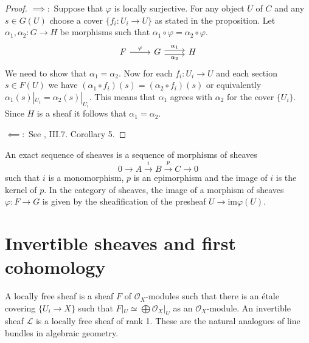 \begin{proof}
	$\implies:$ Suppose that $\varphi$ is locally surjective. For any object $U$ of $C$ and any $s \in G(U)$ choose a cover $\{f_i: U_i \to U\}$ as stated in the proposition. Let $\alpha_1, \alpha_2: G \to H$ be morphisms such that $\alpha_1 \circ \varphi = \alpha_2 \circ \varphi$.
	\[
		\begin{tikzcd}
			F & G & H
			\arrow["\varphi", from=1-1, to=1-2]
			\arrow["{\alpha_2}"', shift right=1, from=1-2, to=1-3]
			\arrow["{\alpha_1}", shift left=1, from=1-2, to=1-3]
		\end{tikzcd}\]
	We need to show that $\alpha_1 = \alpha_2$.  Now for each $f_i: U_i \to U$ and each section $s \in F(U)$ we have $(\alpha_1 \circ f_i)(s) = (\alpha_2 \circ f_i)(s)$ or equivalently  $\alpha_1(s)|_{U_i} = \alpha_2(s)|_{U_i}$. This means that $\alpha_1$ agrees with $\alpha_2$ for the cover $\{U_i\}$. Since $H$ is a sheaf it follows that $\alpha_1 = \alpha_2$.\par
	$\impliedby:$ See \cite{SIGL}, III.7. Corollary 5.
\end{proof}

\begin{definition}
	An exact sequence of sheaves is a sequence of morphisms of sheaves
	\[ 0 \to A \xrightarrow{i} B \xrightarrow{p} C \to 0\]
	such that $i$ is a monomorphism, $p$ is an epimorphism and the image of $i$ is the kernel of $p$. In the category of sheaves, the image of a morphism of sheaves $\varphi \colon F \to G$ is given by the sheafification of the presheaf $U \to \text{im}\varphi(U)$.
\end{definition}

\section{Invertible sheaves and first cohomology}
\begin{definition}
	A locally free sheaf is a sheaf $F$ of $\mathcal{O}_X$-modules such that there is an \'etale covering $\{U_i \to X\}$ such that $F|_U \simeq \bigoplus \mathcal{O}_X|_U$ as an $\mathcal{O}_X$-module. An invertible sheaf $\mathcal{L}$ is a locally free sheaf of rank 1. These are the natural analogues of line bundles in algebraic geometry.
\end{definition}

